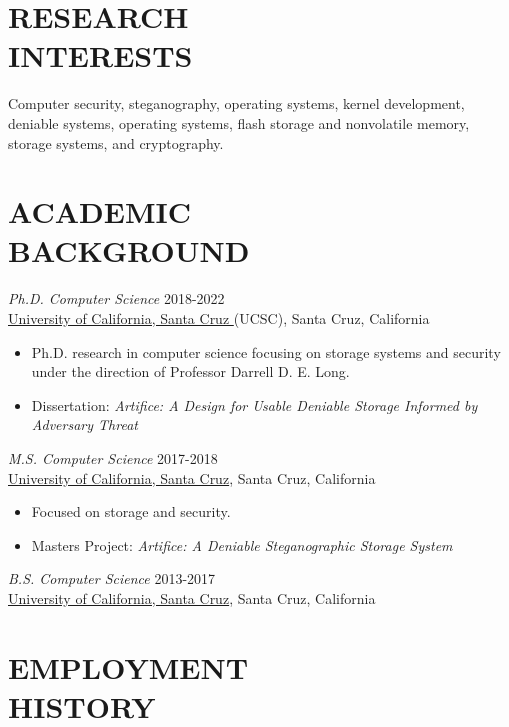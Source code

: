 \documentclass[margin, 10pt]{res} %
\begin{document}
\begin{resume}

\section{RESEARCH \\ INTERESTS}
 
Computer security, steganography, operating systems, kernel development, deniable systems, operating systems, flash storage and nonvolatile memory, storage systems, and cryptography.
 
\section{ACADEMIC \\ BACKGROUND}

{\sl Ph.D. Computer Science} \hfill 2018-2022 \\
\href{https://www.ucsc.edu/}{University of California, Santa Cruz } (UCSC), Santa Cruz, California
\begin{itemize}
\item Ph.D. research in computer science focusing on storage systems and security under the 
direction of Professor Darrell D. E. Long.
\item Dissertation: \emph{Artifice: A Design for Usable Deniable Storage Informed by Adversary Threat}
\end{itemize} 

{\sl M.S. Computer Science} \hfill 2017-2018 \\
\href{http://www.ucsc.edu}{University of California, Santa Cruz}, Santa Cruz, California
\begin{itemize}
\item Focused on storage and security.
\item Masters Project: \emph{Artifice: A Deniable Steganographic Storage System}
\end{itemize} 

{\sl B.S. Computer Science} \hfil 2013-2017 \\
\href{http://www.ucsc.edu}{University of California, Santa Cruz}, Santa Cruz, California


\section{EMPLOYMENT \\HISTORY}


\end{resume}
\end{document}
